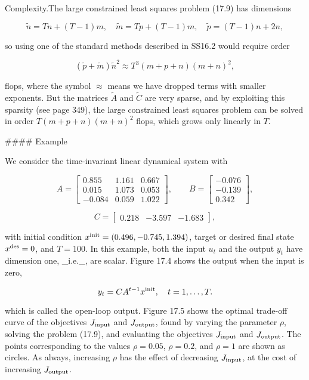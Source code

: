 
Complexity.The large constrained least squares problem (17.9) has dimensions

\[\tilde{n}=Tn+(T-1)m,\quad\tilde{m}=Tp+(T-1)m,\quad\tilde{p}=(T-1)n+2n,\]

so using one of the standard methods described in SS16.2 would require order

\[(\tilde{p}+\tilde{m})\tilde{n}^{2}\approx T^{3}(m+p+n)(m+n)^{2},\]

flops, where the symbol \(\approx\) means we have dropped terms with smaller exponents. But the matrices \(\tilde{A}\) and \(\tilde{C}\) are very sparse, and by exploiting this sparsity (see page 349), the large constrained least squares problem can be solved in order \(T(m+p+n)(m+n)^{2}\) flops, which grows only linearly in \(T\).

#### Example

We consider the time-invariant linear dynamical system with

\[A=\left[\begin{array}{rrr}0.855&1.161&0.667\\ 0.015&1.073&0.053\\ -0.084&0.059&1.022\end{array}\right],\qquad B=\left[\begin{array}{rrr}-0.076 \\ -0.139\\ 0.342\end{array}\right],\]

\[C=\left[\begin{array}{rrr}0.218&-3.597&-1.683\end{array}\right],\]

with initial condition \(x^{\rm init}=(0.496,-0.745,1.394)\), target or desired final state \(x^{\rm des}=0\), and \(T=100\). In this example, both the input \(u_{t}\) and the output \(y_{t}\) have dimension one, _i.e._, are scalar. Figure 17.4 shows the output when the input is zero,

\[y_{t}=CA^{t-1}x^{\rm init},\quad t=1,\ldots,T.\]

which is called the open-loop output. Figure 17.5 shows the optimal trade-off curve of the objectives \(J_{\rm input}\) and \(J_{\rm output}\), found by varying the parameter \(\rho\), solving the problem (17.9), and evaluating the objectives \(J_{\rm input}\) and \(J_{\rm output}\). The points corresponding to the values \(\rho=0.05\), \(\rho=0.2\), and \(\rho=1\) are shown as circles. As always, increasing \(\rho\) has the effect of decreasing \(J_{\rm input}\), at the cost of increasing \(J_{\rm output}\).

